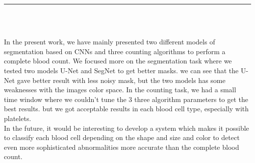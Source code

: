 \vspace*{0.2in}

\thispagestyle{empty}

\begin{center}
    {\color{Black} \rule{4in}{1.4mm} }\\
    \vspace{0.1in}
    \scshape{\fontsize{34}{46}{\bfseries{\color{Black}{Conclusion}}}}
    \\
    \vspace{0.6in}
\end{center}
\begin{changemargin}{0.9cm}{0.9cm}
\hspace*{0.16in}
\end{changemargin}

In the present work, we have mainly presented two different models of segmentation based on CNNs and three counting algorithms to perform a complete blood count.
We focused more on the segmentation task where  we tested two models U-Net and SegNet to get better masks. we can see that the U-Net gave better result with less noisy mask, but the two models has some weaknesses with the images color space.
In the counting task, we had a small time window where we couldn't tune the 3 three algorithm parameters to get the best results. but we got acceptable results in each blood cell type, especially with platelets.\\

In the future, it would be interesting to develop a system which makes it possible to classify each blood cell depending on the shape and size and color to detect even more sophisticated abnormalities more accurate than the complete blood count.